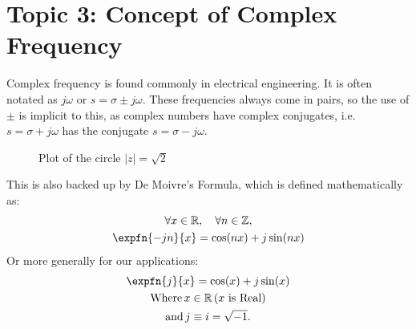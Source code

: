 \documentclass[../notes-main.tex]{subfiles}
\begin{document}
\section{Topic 3: Concept of Complex Frequency}
Complex frequency is found commonly in electrical engineering. It is often notated as \( j\omega \) or \( s = \sigma \pm j \omega \). These frequencies always come in pairs, so the use of \( \pm \) is implicit to this, as complex numbers have complex conjugates, i.e.
\(s = \sigma + j \omega \) has the conjugate \(s = \sigma - j\omega \).
\begin{figure}[H]
    \centering
    \caption{Plot of the circle \(|z| = \sqrt{2}\)}\label{fig:pgfplots-complex-plane-diagram}
\end{figure}
\noindent This is also backed up by De Moivre's Formula, which is defined mathematically as:
\begin{gather}
    \forall x \in \mathbb{R}, \quad \forall n \in \mathbb{Z}, \\
    \expfn{-jn}{x} = \cos(n x) + j \sin(n x)
    \label{eq:de-moivre-formula}
\end{gather}
Or more generally for our applications:
\begin{gather}
    \expfn{j}{x} = \cos(x) + j\sin(x) \\
    \text{Where} \, x \in \mathbb{R}\, \text{(\(x\) is Real)} \\
    \text{and} \, j \equiv i = \sqrt{-1}.
    \label{eq:de-moivre-formula-general}
\end{gather}
\end{document}
